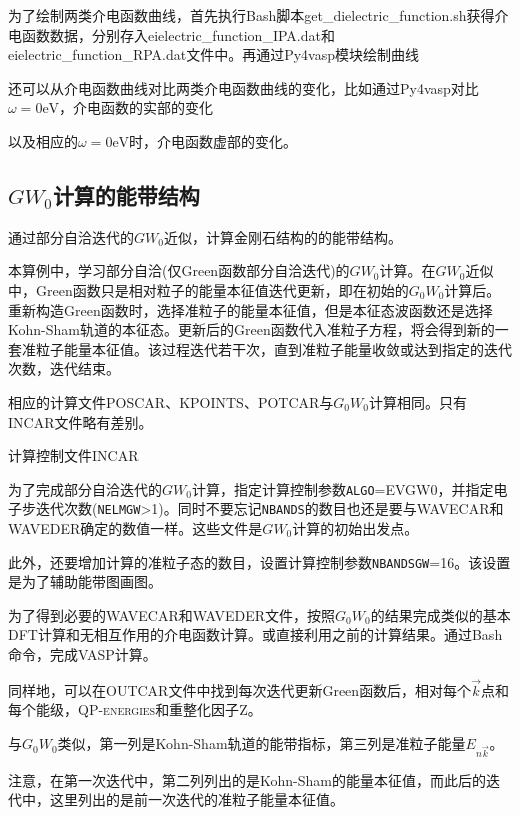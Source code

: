 为了绘制两类介电函数曲线，首先执行\textrm{Bash}脚本\textrm{get\_dielectric\_function.sh}获得介电函数数据，分别存入\textrm{eielectric\_function\_IPA.dat}和\textrm{eielectric\_function\_RPA.dat}文件中。再通过\textrm{Py4vasp}模块绘制曲线

还可以从介电函数曲线对比两类介电函数曲线的变化，比如通过\textrm{Py4vasp}对比$\omega=0\mathrm{eV}$，介电函数的实部的变化

以及相应的$\omega=0\mathrm{eV}$时，介电函数虚部的变化。

\subsection{$GW_0$计算的能带结构}
通过部分自洽迭代的$GW_0$近似，计算金刚石结构的的能带结构。

本算例中，学习部分自洽(仅\textrm{Green}函数部分自洽迭代)的$GW_0$计算。在$GW_0$近似中，\textrm{Green}函数只是相对粒子的能量本征值迭代更新，即在初始的$G_0W_0$计算后。重新构造\textrm{Green}函数时，选择准粒子的能量本征值，但是本征态波函数还是选择\textrm{Kohn-Sham}轨道的本征态。更新后的\textrm{Green}函数代入准粒子方程，将会得到新的一套准粒子能量本征值。该过程迭代若干次，直到准粒子能量收敛或达到指定的迭代次数，迭代结束。

相应的计算文件\textrm{POSCAR}、\textrm{KPOINTS}、\textrm{POTCAR}与$G_0W_0$计算相同。只有\textrm{INCAR}文件略有差别。

计算控制文件\textrm{INCAR}

为了完成部分自洽迭代的$GW_0$计算，指定计算控制参数\texttt{ALGO}=\textrm{EVGW0}，并指定电子步迭代次数(\texttt{NELMGW}>1)。同时不要忘记\texttt{NBANDS}的数目也还是要与\textrm{WAVECAR}和\textrm{WAVEDER}确定的数值一样。这些文件是$GW_0$计算的初始出发点。

此外，还要增加计算的准粒子态的数目，设置计算控制参数\texttt{NBANDSGW}=16。该设置是为了辅助能带图画图。

为了得到必要的\textrm{WAVECAR}和\textrm{WAVEDER}文件，按照$G_0W_0$的结果完成类似的基本\textrm{DFT}计算和无相互作用的介电函数计算。或直接利用之前的计算结果。通过\textrm{Bash}命令，完成\textrm{VASP}计算。

同样地，可以在\textrm{OUTCAR}文件中找到每次迭代更新\textrm{Green}函数后，相对每个$\vec k$点和每个能级，\textsc{QP-energies}和重整化因子\textsc{Z}。

与$G_0W_0$类似，第一列是\textrm{Kohn-Sham}轨道的能带指标，第三列是准粒子能量$E_{n\vec k}$。

注意，在第一次迭代中，第二列列出的是\textrm{Kohn-Sham}的能量本征值，而此后的迭代中，这里列出的是前一次迭代的准粒子能量本征值。

